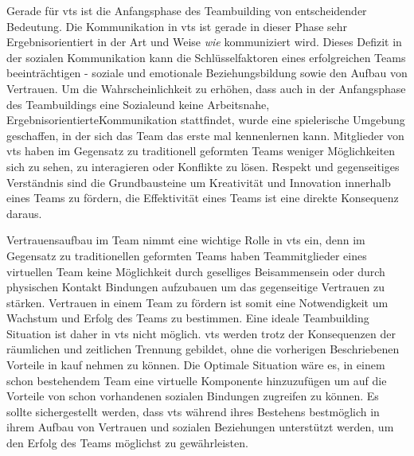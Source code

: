 \documentclass[a4paper,11pt]{article}%
\renewcommand{\\}{\vspace*{0.5\baselineskip} \newline}
\begin{document}

Gerade für \ac{vts} ist die Anfangsphase des Teambuilding von entscheidender Bedeutung. 
Die Kommunikation in \ac{vts} ist gerade in dieser Phase sehr Ergebnisorientiert in der Art und Weise \textit{wie} kommuniziert wird. Dieses Defizit in der sozialen Kommunikation kann die Schlüsselfaktoren eines erfolgreichen Teams beeinträchtigen - soziale und emotionale Beziehungsbildung sowie den Aufbau von Vertrauen. \citep[p.378]{ren2007applying} \\
Um die Wahrscheinlichkeit zu erhöhen, dass auch in der Anfangsphase des Teambuildings eine \glqq Soziale\grqq und keine \glqq Arbeitsnahe, Ergebnisorientierte\grqq Kommunikation stattfindet, wurde eine spielerische Umgebung geschaffen, in der sich das Team das erste mal kennenlernen kann. 
Mitglieder von \ac{vts} haben im Gegensatz zu traditionell geformten Teams weniger Möglichkeiten sich zu sehen, zu interagieren oder Konflikte zu lösen. 
Respekt und gegenseitiges Verständnis sind die Grundbausteine um Kreativität und Innovation innerhalb eines Teams zu fördern, die Effektivität eines Teams ist eine direkte Konsequenz daraus.

Vertrauensaufbau im Team nimmt eine wichtige Rolle in \ac{vts} ein, denn im Gegensatz zu traditionellen geformten Teams haben Teammitglieder eines virtuellen Team keine Möglichkeit durch geselliges Beisammensein oder durch physischen Kontakt Bindungen aufzubauen um das gegenseitige Vertrauen zu stärken.\citep{TrustAndTheVirtualOrganisation}  \\
Vertrauen in einem Team zu fördern ist somit eine Notwendigkeit um Wachstum und Erfolg des Teams zu bestimmen. 
\citep{glacel1997teamwork} \\
Eine ideale Teambuilding Situation ist daher in \ac{vts} nicht möglich. 
\ac{vts} werden trotz der Konsequenzen der räumlichen und zeitlichen Trennung gebildet, ohne die vorherigen Beschriebenen Vorteile in kauf nehmen zu können. Die Optimale Situation wäre es, in einem schon bestehendem Team eine virtuelle Komponente hinzuzufügen um auf die Vorteile von schon vorhandenen sozialen Bindungen zugreifen zu können. \citep[p.36-37]{holton2001building}
Es sollte sichergestellt werden, dass \ac{vts} während ihres Bestehens bestmöglich in ihrem Aufbau von Vertrauen und sozialen Beziehungen unterstützt werden, um den Erfolg des Teams möglichst zu gewährleisten.
\end{document}

